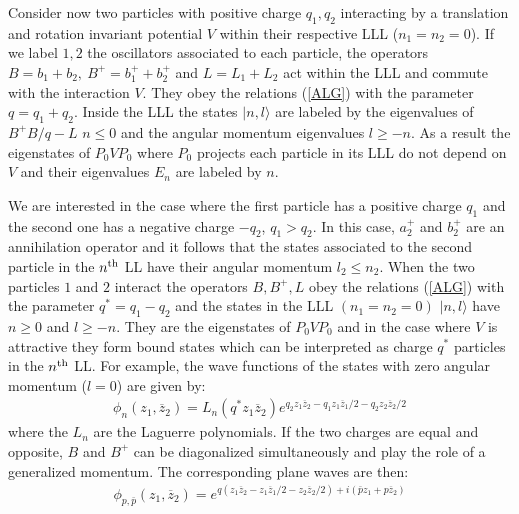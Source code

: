 \documentclass[a4paper,11pt]{article}
\newcommand{\zbar}{\overline z}
\newcommand{\del}{\partial}
\begin{document}
Consider now two particles with positive charge $q_1,q_2$ interacting
by a translation and rotation invariant potential $V$ within 
their respective LLL ($n_1=n_2=0$).
If we label $1,2$ the oscillators associated to each particle, the operators
$B=b_1+b_2,\ B^+=b^+_1+b^+_2$ and $L=L_1+L_2$
act within the LLL and
commute with the interaction $V$.
They obey the relations (\ref{ALG}) with the parameter $q=q_1+q_2$.
Inside the LLL  the states $|n,l\rangle$ are labeled by
the eigenvalues of
$B^+B/q-L$ $n \le 0$   and the angular momentum 
eigenvalues $l \ge -n$. 
As a result the
eigenstates of $P_0VP_0$ where $P_0$ projects each particle in its
LLL do not depend on $V$ and their eigenvalues
$E_n$ are labeled by $n$. 

We are interested in the case where the first particle has a positive
charge $q_1$ and the second one has a negative charge $-q_2$, $q_1>q_2$.
In this case, $a^+_2$ and $b^+_2$ are an annihilation operator and it follows 
that the states associated to the second particle in the
$n^{\rm th}$ LL have their angular momentum $l_2\le n_2$.
When the two particles $1$ and $2$ interact
the operators $B,B^+,L$ obey the relations (\ref{ALG})
with the parameter $q^*=q_1-q_2$ and the states in the LLL $(n_1=n_2=0)$
$|n,l\rangle$ have $n\ge 0$ and $l \ge -n$.
They are the
eigenstates of $P_0VP_0$ and in the case where $V$ is attractive
they form
bound states which can be interpreted
as charge $q^*$ particles in the $ n^{\rm th}$ LL.
For example, the wave functions of the states with 
zero angular momentum ($l=0$) are given by:
\begin{eqnarray}
\phi_n(z_1,\zbar_2)=L_n(q^*z_1\zbar_2)
e^{q_2z_1\zbar_2-q_1z_1\zbar_1/2-q_2z_2\zbar_2/2}
\end{eqnarray}
where the $L_n$ are the Laguerre polynomials.
If the two charges are equal and opposite,  
$B$ and $B^+$ can be diagonalized simultaneously and play the role
of a generalized momentum.
The corresponding plane waves are then:
\begin{eqnarray}
\phi_{p,\bar p}(z_1,\zbar_2)=e^{q(z_1\zbar_2-
z_1\zbar_1/2-z_2\zbar_2/2)+i(\bar pz_1+p \zbar_2)}
\end{eqnarray}
\end{document}

